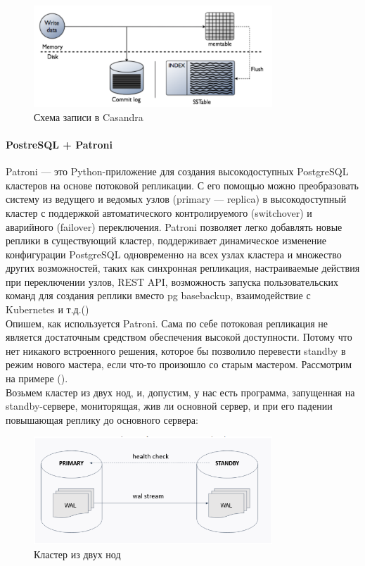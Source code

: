 \begin{figure}[h]
    \centering
    \includegraphics[width=0.8\textwidth]{assets/casandra.png}
    \caption{Схема записи в Casandra}
    \label{fig:mesh2}
\end{figure}

\paragraph{PostreSQL + Patroni}

Patroni — это Python-приложение для создания высокодоступных PostgreSQL кластеров на основе потоковой репликации. С его помощью можно преобразовать систему из ведущего и ведомых узлов (primary — replica) в высокодоступный кластер с поддержкой автоматического контролируемого (switchover) и аварийного (failover) переключения. Patroni позволяет легко добавлять новые реплики в существующий кластер, поддерживает динамическое изменение конфигурации PostgreSQL одновременно на всех узлах кластера и множество других возможностей, таких как синхронная репликация, настраиваемые действия при переключении узлов, REST API, возможность запуска пользовательских команд для создания реплики вместо pg basebackup, взаимодействие с Kubernetes и т.д.(\autocite{Klyukin}) \\

Опишем, как используется Patroni. Сама по себе потоковая репликация не является достаточным средством обеспечения высокой доступности. Потому что нет никакого встроенного решения, которое бы позволило перевести standby в режим нового мастера, если что-то произошло со старым мастером. Рассмотрим на примере (\autocite{Aristov}).\\
Возьмем кластер из двух нод, и, допустим, у нас есть программа, запущенная на standby-сервере, мониторящая, жив ли основной сервер, и при его падении повышающая реплику до основного сервера:

\begin{figure}[h]
    \centering
    \includegraphics[width=0.8\textwidth]{assets/Patroni1.png}
    \caption{Кластер из двух нод}
    \label{fig:mesh3}
\end{figure}

